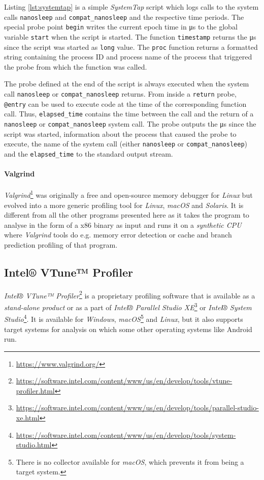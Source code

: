     Listing \ref{lst:systemtap} is a simple \textit{SystemTap} script which logs calls to the system calls \lstinline|nanosleep| and \lstinline|compat_nanosleep| and the respective time periods. The special probe point \lstinline|begin| writes the current epoch time in \si{\micro\second} to the global variable \lstinline|start| when the script is started. The function \lstinline|timestamp| returns the \si{\micro\second} since the script was started as \lstinline|long| value. The \lstinline|proc| function returns a formatted string containing the process ID and process name of the process that triggered the probe from which the function was called.

    The probe defined at the end of the script is always executed when the system call \lstinline|nanosleep| or \lstinline|compat_nanosleep| returns. From inside a \lstinline|return| probe, \lstinline|@entry| can be used to execute code at the time of the corresponding function call. Thus, \lstinline|elapsed_time| contains the time between the call and the return of a \lstinline|nanosleep| or \lstinline|compat_nanosleep| system call. The probe outputs the \si{\micro\second} since the script was started, information about the process that caused the probe to execute, the name of the system call (either \lstinline|nanosleep| or \lstinline|compat_nanosleep|) and the \lstinline|elapsed_time| to the standard output stream.

\paragraph{Valgrind}

    \textit{Valgrind}\footnote{\url{https://www.valgrind.org/}} was originally a free and open-source memory debugger for \textit{Linux} but evolved into a more generic profiling tool for \textit{Linux}, \textit{macOS} and \textit{Solaris}. It is different from all the other programs presented here as it takes the program to analyse in the form of a x86 binary as input and runs it on a \emph{synthetic CPU} where \textit{Valgrind} tools do e.g. memory error detection or cache and branch prediction profiling of that program.

\subsection{Intel® VTune™ Profiler} \label{subsec:vtune}

    \textit{Intel® VTune™ Profiler}\footnote{\url{https://software.intel.com/content/www/us/en/develop/tools/vtune-profiler.html}} is a proprietary profiling software that is available as a \emph{stand-alone product} or as a part of \textit{Intel® Parallel Studio XE}\footnote{\url{https://software.intel.com/content/www/us/en/develop/tools/parallel-studio-xe.html}} or \textit{Intel® System Studio}\footnote{\url{https://software.intel.com/content/www/us/en/develop/tools/system-studio.html}}. It is available for \textit{Windows}, \textit{macOS}\footnote{There is no collector available for \textit{macOS}, which prevents it from being a target system.} and \textit{Linux}, but it also supports target systems for analysis on which some other operating systems like Android run.

